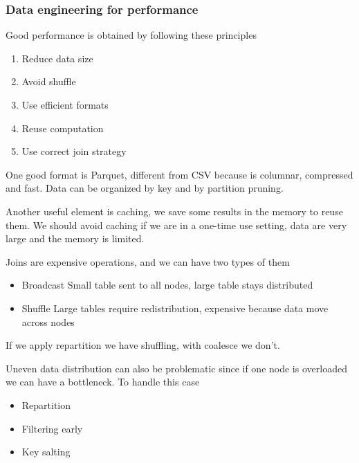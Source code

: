 \subsubsection{Data engineering for performance}

Good performance is obtained by following these principles

\begin{enumerate}
    \item Reduce data size
    \item Avoid shuffle
    \item Use efficient formats
    \item Reuse computation
    \item Use correct join strategy
\end{enumerate}

One good format is Parquet, different from CSV because is columnar, compressed and fast. Data can be organized by key and by partition pruning.

Another useful element is caching, we save some results in the memory to reuse them. We should avoid caching if we are in a one-time use setting, data are very large and the memory is limited. 

\vspace{10pt}

Joins are expensive operations, and we can have two types of them

\begin{itemize}
    \item Broadcast \ra Small table sent to all nodes, large table stays distributed
    \item Shuffle \ra Large tables require redistribution, expensive because data move across nodes
\end{itemize}

If we apply repartition we have shuffling, with coalesce we don't.

\vspace{10pt}

Uneven data distribution can also be problematic since if one node is overloaded we can have a bottleneck. To handle this case

\begin{itemize}
    \item Repartition
    \item Filtering early
    \item Key salting
\end{itemize}

